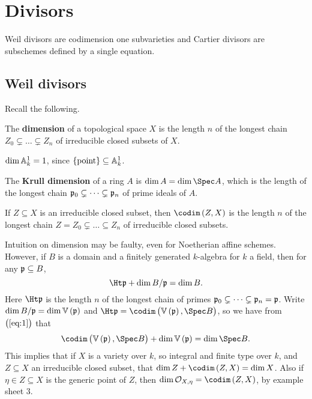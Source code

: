 \pagebreak

\section{Divisors}

Weil divisors are codimension one subvarieties and Cartier divisors are subschemes defined by a single equation.

\subsection{Weil divisors}

Recall the following.

\begin{definition*}
The \textbf{dimension} of a topological space $ X $ is the length $ n $ of the longest chain $ Z_0 \subsetneq \dots \subsetneq Z_n $ of irreducible closed subsets of $ X $.
\end{definition*}

\begin{example*}
$ \dim \AA_k^1 = 1 $, since $ \cbr{\text{point}} \subseteq \AA_k^1 $.
\end{example*}

\begin{definition*}
The \textbf{Krull dimension} of a ring $ A $ is $ \dim A = \dim \Spec A $, which is the length of the longest chain $ \ppp_0 \subsetneq \dots \subsetneq \ppp_n $ of prime ideals of $ A $.
\end{definition*}

\begin{definition*}
If $ Z \subseteq X $ is an irreducible closed subset, then $ \codim\br{Z, X} $ is the length $ n $ of the longest chain $ Z = Z_0 \subsetneq \dots \subseteq Z_n $ of irreducible closed subsets.
\end{definition*}

\begin{remark*}
Intuition on dimension may be faulty, even for Noetherian affine schemes. However, if $ B $ is a domain and a finitely generated $ k $-algebra for $ k $ a field, then for any $ \ppp \subseteq B $,
\begin{equation}
\label{eq:1}
\Ht \ppp + \dim B / \ppp = \dim B.
\end{equation}
Here $ \Ht \ppp $ is the length $ n $ of the longest chain of primes $ \ppp_0 \subsetneq \dots \subsetneq \ppp_n = \ppp $. Write $ \dim B / \ppp = \dim \VV\br{\ppp} $ and $ \Ht \ppp = \codim\br{\VV\br{\ppp}, \Spec B} $, so we have from $ \br{\ref{eq:1}} $ that
$$ \codim\br{\VV\br{\ppp}, \Spec B} + \dim \VV\br{\ppp} = \dim \Spec B. $$
This implies that if $ X $ is a variety over $ k $, so integral and finite type over $ k $, and $ Z \subseteq X $ an irreducible closed subset, that $ \dim Z + \codim\br{Z, X} = \dim X $. Also if $ \eta \in Z \subseteq X $ is the generic point of $ Z $, then $ \dim \OOO_{X, \eta} = \codim\br{Z, X} $, by example sheet $ 3 $.
\end{remark*}

